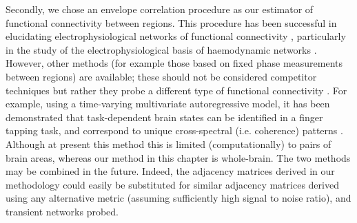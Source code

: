 Secondly, we chose an envelope correlation procedure as our estimator of functional connectivity between regions. This procedure has been successful in elucidating electrophysiological networks of functional connectivity \citep{Colclough2016}, particularly in the study of the electrophysiological basis of haemodynamic networks \citep{Tewarie2016}. However, other methods (for example those based on fixed phase measurements between regions) are available; these should not be considered competitor techniques but rather they probe a different type of functional connectivity \citep{Scholvinck2013}. For example, using a time-varying multivariate autoregressive model, it has been demonstrated that task-dependent brain states can be identified in a finger tapping task, and correspond to unique cross-spectral (i.e. coherence) patterns \citep{Vidaurre2016}. Although at present this method this is limited (computationally) to pairs of brain areas, whereas our method in this chapter is whole-brain. The two methods may be combined in the future. Indeed, the adjacency matrices derived in our methodology could easily be substituted for similar adjacency matrices derived using any alternative metric (assuming sufficiently high signal to noise ratio), and transient networks probed.

